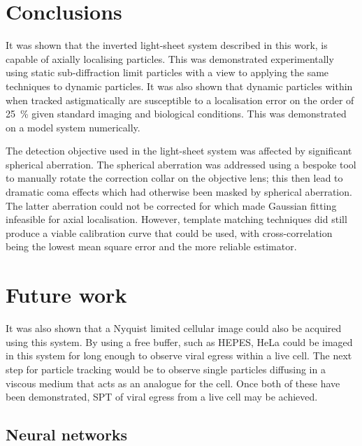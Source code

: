 \section{Conclusions}

It was shown that the inverted light-sheet system described in this work, is capable of axially localising particles.
This was demonstrated experimentally using static sub-diffraction limit particles with a view to applying the same techniques to dynamic particles.
It was also shown that dynamic particles within when tracked astigmatically are susceptible to a localisation error on the order of \SI{25}{\percent} given standard imaging and biological conditions.
This was demonstrated on a model system numerically.

The detection objective used in the light-sheet system was affected by significant spherical aberration.
The spherical aberration was addressed using a bespoke tool to manually rotate the correction collar on the objective lens; this then lead to dramatic coma effects which had otherwise been masked by spherical aberration.
The latter aberration could not be corrected for which made Gaussian fitting infeasible for axial localisation.
However, template matching techniques did still produce a viable calibration curve that could be used, with cross-correlation being the lowest mean square error
and the more reliable estimator.


\section{Future work}

It was also shown that a Nyquist limited cellular image could also be acquired using this system.
By using a  free buffer, such as HEPES, HeLa could be imaged in this system for long enough to observe viral egress within a live cell.
The next step for particle tracking would be to observe single particles diffusing in a viscous medium that acts as an analogue for the cell.
Once both of these have been demonstrated, SPT of viral egress from a live cell may be achieved.

\subsection{Neural networks} %


